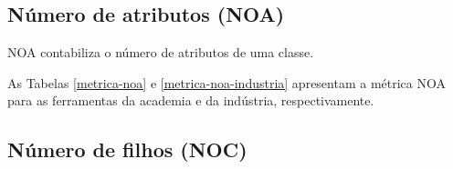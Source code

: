 
\subsection{Número de atributos (NOA)}

NOA contabiliza o número de atributos de uma classe.

As Tabelas \ref{metrica-noa} e \ref{metrica-noa-industria} apresentam a
métrica NOA para as ferramentas da academia e da indústria, respectivamente.



\subsection{Número de filhos (NOC)}

